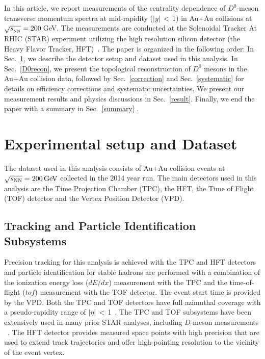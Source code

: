 \documentclass[%
 reprint,	
 amsmath,amssymb,
 aps,
 prc,
]{revtex4-1}
\begin{document}
In this article, we report measurements of the centrality dependence of $D^0$-meson transverse momentum spectra at mid-rapidity ($|y|$\,$<$\,1) in Au+Au collisions at $\sqrt{s_{_{\rm NN}}} = 200$\,GeV. The measurements are conducted at the Solenoidal Tracker At RHIC (STAR) experiment utilizing the high resolution silicon detector (the Heavy Flavor Tracker, HFT)~\cite{Contin:2017mck}. The paper is organized in the following order: In Sec.~\ref{dataset}, we describe the detector setup and dataset used in this analysis. In Sec.~\ref{D0recon}, we present the topological reconstruction of $D^0$ mesons in the Au+Au collision data, followed by Sec.~\ref{correction} and Sec.~\ref{systematic} for details on efficiency corrections and systematic uncertainties. We present our measurement results and physics discussions in Sec.~\ref{result}. Finally, we end the paper with a summary in Sec.~\ref{summary} .

\section{Experimental setup and Dataset}
\label{dataset}

The dataset used in this analysis consists of Au+Au collision events at ${\sqrt{s_{\rm NN}} = \rm{200\,GeV}}$ collected in the 2014 year run. The main detectors used in this analysis are the Time Projection Chamber (TPC), the HFT, the Time of Flight (TOF) detector and the Vertex Position Detector (VPD). 

\subsection{Tracking and Particle Identification Subsystems}
\label{dataset:tpctof}

Precision tracking for this analysis is achieved with the TPC and HFT detectors and particle identification for stable hadrons are performed with a combination of the ionization energy loss ($dE/dx$) measurement with the TPC and the time-of-flight ($tof$) measurement with the TOF detector. The event start time is provided by the VPD. Both the TPC and TOF detectors have full azimuthal coverage with a pseudo-rapidity range of $|\eta|$\,$<$\,1~\cite{TPC,TOF}. The TPC and TOF subsystems have been extensively used in many prior STAR analyses, including $D$-meson measurements ~\cite{Star_D_pp,Star_D_RAA,Adamczyk:2015ukd}. The HFT detector provides measured space points with high precision that are used to extend track trajectories and offer high-pointing resolution to the vicinity of the event vertex.
\end{document}
